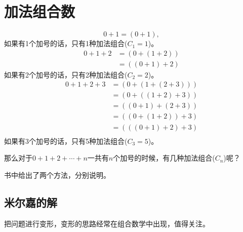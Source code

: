 \documentclass[cn]{elegantbook}
\begin{document}
\chapter{加法组合数}
\[
0 + 1 = (0+1),
\]
如果有1个加号的话，只有1种加法组合($C_1=1$)。
\[
\begin{aligned}
0+1+2 &= (0 + (1+2))\\
&=((0+1) + 2)
\end{aligned}
\]
如果有2个加号的话，只有2种加法组合($C_2=2$)。
\[
\begin{aligned}
0+1+2+3 &= (0 + (1+(2+3)))\\
&=(0+((1+2)+3))\\
&=((0+1) + (2+3))\\
&=((0+(1 + 2))+3)\\
&=(((0+1) + 2)+3)\\
\end{aligned}
\]
如果有3个加号的话，只有5种加法组合($C_3=5$)。

那么对于$0+1+2+\cdots+n$一共有$n$个加号的时候，有几种加法组合($C_n$)呢？

书中给出了两个方法，分别说明。

\section{米尔嘉的解}
把问题进行变形，变形的思路经常在组合数学中出现，值得关注。
\end{document}
